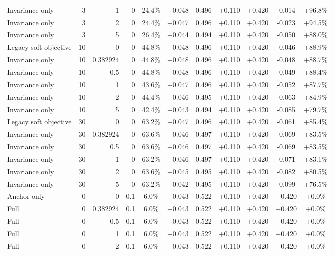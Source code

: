 \begin{table}[htbp]
\begin{tabular}{lrrrccccccc}
Invariance only & 3 & 1 & 0 & 24.4\% & +0.048 & 0.496 & +0.110 & +0.420 & -0.014 & +96.8\% \\
Invariance only & 3 & 2 & 0 & 24.4\% & +0.047 & 0.496 & +0.110 & +0.420 & -0.023 & +94.5\% \\
Invariance only & 3 & 5 & 0 & 26.4\% & +0.044 & 0.494 & +0.110 & +0.420 & -0.050 & +88.0\% \\
Legacy soft objective & 10 & 0 & 0 & 44.8\% & +0.048 & 0.496 & +0.110 & +0.420 & -0.046 & +88.9\% \\
Invariance only & 10 & 0.382924 & 0 & 44.8\% & +0.048 & 0.496 & +0.110 & +0.420 & -0.048 & +88.7\% \\
Invariance only & 10 & 0.5 & 0 & 44.8\% & +0.048 & 0.496 & +0.110 & +0.420 & -0.049 & +88.4\% \\
Invariance only & 10 & 1 & 0 & 43.6\% & +0.047 & 0.496 & +0.110 & +0.420 & -0.052 & +87.7\% \\
Invariance only & 10 & 2 & 0 & 44.4\% & +0.046 & 0.495 & +0.110 & +0.420 & -0.063 & +84.9\% \\
Invariance only & 10 & 5 & 0 & 42.4\% & +0.043 & 0.494 & +0.110 & +0.420 & -0.085 & +79.7\% \\
Legacy soft objective & 30 & 0 & 0 & 63.2\% & +0.047 & 0.496 & +0.110 & +0.420 & -0.061 & +85.4\% \\
Invariance only & 30 & 0.382924 & 0 & 63.6\% & +0.046 & 0.497 & +0.110 & +0.420 & -0.069 & +83.5\% \\
Invariance only & 30 & 0.5 & 0 & 63.6\% & +0.046 & 0.497 & +0.110 & +0.420 & -0.069 & +83.5\% \\
Invariance only & 30 & 1 & 0 & 63.2\% & +0.046 & 0.497 & +0.110 & +0.420 & -0.071 & +83.1\% \\
Invariance only & 30 & 2 & 0 & 63.6\% & +0.045 & 0.495 & +0.110 & +0.420 & -0.082 & +80.5\% \\
Invariance only & 30 & 5 & 0 & 63.2\% & +0.042 & 0.495 & +0.110 & +0.420 & -0.099 & +76.5\% \\
Anchor only & 0 & 0 & 0.1 & 6.0\% & +0.043 & 0.522 & +0.110 & +0.420 & +0.420 & +0.0\% \\
Full & 0 & 0.382924 & 0.1 & 6.0\% & +0.043 & 0.522 & +0.110 & +0.420 & +0.420 & +0.0\% \\
Full & 0 & 0.5 & 0.1 & 6.0\% & +0.043 & 0.522 & +0.110 & +0.420 & +0.420 & +0.0\% \\
Full & 0 & 1 & 0.1 & 6.0\% & +0.043 & 0.522 & +0.110 & +0.420 & +0.420 & +0.0\% \\
Full & 0 & 2 & 0.1 & 6.0\% & +0.043 & 0.522 & +0.110 & +0.420 & +0.420 & +0.0\% \\

\end{tabular}
\end{table}
